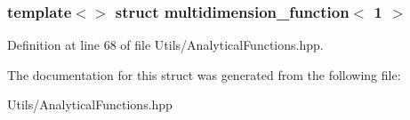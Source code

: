 \subsubsection*{template$<$$>$\newline
struct multidimension\+\_\+function$<$ 1 $>$}



Definition at line 68 of file Utils/\+Analytical\+Functions.\+hpp.



The documentation for this struct was generated from the following file\+:\begin{DoxyCompactItemize}
\item 
Utils/\+Analytical\+Functions.\+hpp\end{DoxyCompactItemize}
